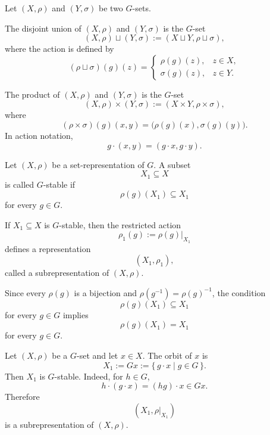 Let \((X,\rho)\) and \((Y,\sigma)\) be two \(G\)-sets.

\begin{definition}
    The disjoint union of \((X,\rho)\) and \((Y,\sigma)\) is the \(G\)-set
    \[
        (X,\rho)\sqcup (Y,\sigma)
        :=
        (X\sqcup Y,\rho\sqcup\sigma),
    \]
    where the action is defined by
    \[
        (\rho\sqcup\sigma)(g)(z)
        =
        \begin{cases}
            \rho(g)(z), & z\in X,\\
            \sigma(g)(z), & z\in Y.
        \end{cases}
    \]
\end{definition}

\begin{definition}
    The product of \((X,\rho)\) and \((Y,\sigma)\) is the \(G\)-set
    \[
        (X,\rho)\times (Y,\sigma)
        :=
        (X\times Y,\rho\times\sigma),
    \]
    where
    \[
        (\rho\times\sigma)(g)(x,y)
        =
        \bigl(\rho(g)(x),\sigma(g)(y)\bigr).
    \]
    In action notation,
    \[
        g\cdot (x,y)=(g\cdot x,g\cdot y).
    \]
\end{definition}

\begin{definition}
    Let \((X,\rho)\) be a set-representation of \(G\). A subset
    \[
        X_1\subseteq X
    \]
    is called \(G\)-stable if
    \[
        \rho(g)(X_1)\subseteq X_1
    \]
    for every \(g\in G\).

    If \(X_1\subseteq X\) is \(G\)-stable, then the restricted action
    \[
        \rho_1(g):=\rho(g)|_{X_1}
    \]
    defines a representation
    \[
        (X_1,\rho_1),
    \]
    called a subrepresentation of \((X,\rho)\).
\end{definition}

\begin{remark}
    Since every \(\rho(g)\) is a bijection and \(\rho(g^{-1})=\rho(g)^{-1}\), the
    condition
    \[
        \rho(g)(X_1)\subseteq X_1
    \]
    for every \(g\in G\) implies
    \[
        \rho(g)(X_1)=X_1
    \]
    for every \(g\in G\).
\end{remark}

\begin{example}
    Let \((X,\rho)\) be a \(G\)-set and let \(x\in X\). The orbit of \(x\) is
    \[
        X_1:=Gx:=\{\,g\cdot x\mid g\in G\,\}.
    \]
    Then \(X_1\) is \(G\)-stable. Indeed, for \(h\in G\),
    \[
        h\cdot (g\cdot x)=(hg)\cdot x\in Gx.
    \]
    Therefore
    \[
        (X_1,\rho|_{X_1})
    \]
    is a subrepresentation of \((X,\rho)\).
\end{example}

